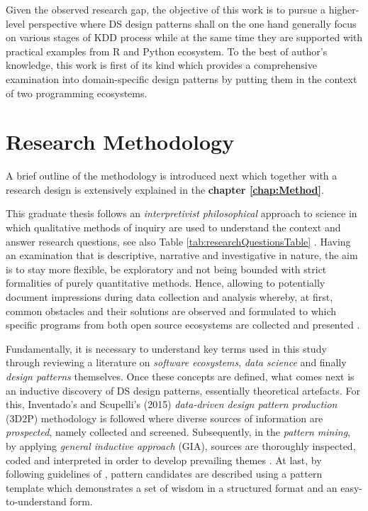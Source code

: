 Given the observed research gap, the objective of this work is to pursue a higher-level perspective where \ac{DS} design patterns shall on the one hand generally focus on various stages of \ac{KDD} process while at the same time they are supported with practical examples from R and Python ecosystem.
To the best of author's knowledge, this work is first of its kind which provides a comprehensive examination into domain-specific design patterns by putting them in the context of two programming ecosystems.

\section{Research Methodology}
\label{researchmethod}
A brief outline of the methodology is introduced next which together with a research design is extensively explained in the \textbf{chapter \ref{chap:Method}}.

This graduate thesis follows an \emph{interpretivist philosophical} approach to science in which qualitative methods of inquiry are used to understand the context and answer research questions, see also Table \ref{tab:researchQuestionsTable} \parencites{Mayers1997}{Saunders2015}. 
Having an examination that is descriptive, narrative and investigative in nature, the aim is to stay more flexible, be exploratory and not being bounded with strict formalities of purely quantitative methods. 
Hence, allowing to potentially document impressions during data collection and analysis whereby, at first, common obstacles and their solutions are observed and formulated to which specific programs from both open source ecosystems are collected and presented \parencite{Mayers1997}. 

Fundamentally, it is necessary to understand key terms used in this study through reviewing a literature on \emph{software ecosystems}, \emph{data science} and finally \emph{design patterns} themselves.  
Once these concepts are defined, what comes next is an inductive discovery of \ac{DS} design patterns, essentially theoretical artefacts. 
For this, Inventado's and Scupelli's (2015) \emph{data-driven design pattern production} (\ac{3D2P}) methodology is followed where diverse sources of information are \emph{prospected}, namely collected and screened.
Subsequently, in the \emph{pattern mining}, by applying \emph{general inductive approach} (\ac{GIA}), sources are thoroughly inspected, coded and interpreted in order to develop prevailing themes \parencites{t06}{Mayers1997}{SeamanC1999}.
At last, by following guidelines of \textcites{DobleMeszaros1997}{AndreseasWellhausenTim2011}{BruseDougals2002}, pattern candidates are described using a pattern template which demonstrates a set of wisdom in a structured format and an easy-to-understand form.

